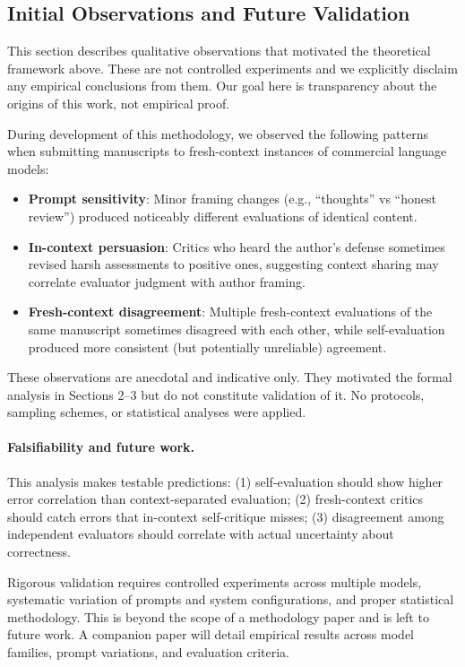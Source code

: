 \documentclass[11pt]{article}
\begin{document}
\subsection{Initial Observations and Future Validation}
\label{sec:observations}

This section describes qualitative observations that motivated the theoretical framework
above. These are not controlled experiments and we explicitly disclaim any empirical
conclusions from them. Our goal here is transparency about the origins of this work, not
empirical proof.

During development of this methodology, we observed the following patterns when submitting
manuscripts to fresh-context instances of commercial language models:

\begin{itemize}
    \item \textbf{Prompt sensitivity}: Minor framing changes (e.g., ``thoughts'' vs
    ``honest review'') produced noticeably different evaluations of identical content.
    \item \textbf{In-context persuasion}: Critics who heard the author's defense sometimes
    revised harsh assessments to positive ones, suggesting context sharing may correlate
    evaluator judgment with author framing.
    \item \textbf{Fresh-context disagreement}: Multiple fresh-context evaluations of the
    same manuscript sometimes disagreed with each other, while self-evaluation produced more
    consistent (but potentially unreliable) agreement.
\end{itemize}

These observations are anecdotal and indicative only. They motivated the formal analysis in
Sections 2--3 but do not constitute validation of it. No protocols, sampling schemes, or
statistical analyses were applied.

\paragraph{Falsifiability and future work.} This analysis makes testable predictions:
(1) self-evaluation should show higher error correlation than context-separated evaluation;
(2) fresh-context critics should catch errors that in-context self-critique misses;
(3) disagreement among independent evaluators should correlate with actual uncertainty
about correctness.

Rigorous validation requires controlled experiments across multiple models, systematic
variation of prompts and system configurations, and proper statistical methodology. This is
beyond the scope of a methodology paper and is left to future work. A companion paper will
detail empirical results across model families, prompt variations, and evaluation criteria.
\end{document}
